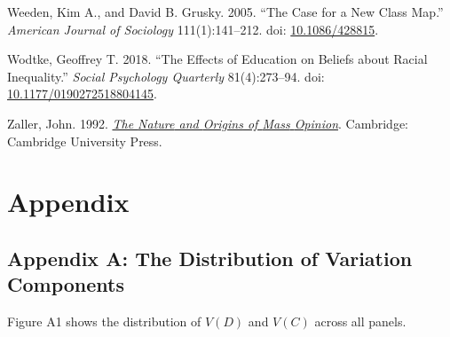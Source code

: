 \documentclass[
  12pt,
]{article}
\newlength{\cslhangindent}
\newlength{\cslentryspacingunit} %
\newenvironment{CSLReferences}[2] %
 {%
  \setlength{\parindent}{0pt}
  \ifodd #1
  \let\oldpar\par
  \def\par{\hangindent=\cslhangindent\oldpar}
  \fi
  \setlength{\parskip}{#2\cslentryspacingunit}
 }%
 {}
\begin{document}
\begin{CSLReferences}{1}{0}
\leavevmode{}%
Weeden, Kim A., and David B. Grusky. 2005. {``The {Case} for a {New}
{Class} {Map}.''} \emph{American Journal of Sociology} 111(1):141--212.
doi: \href{https://doi.org/10.1086/428815}{10.1086/428815}.

\leavevmode{}%
Wodtke, Geoffrey T. 2018. {``The {Effects} of {Education} on {Beliefs}
about {Racial} {Inequality}.''} \emph{Social Psychology Quarterly}
81(4):273--94. doi:
\href{https://doi.org/10.1177/0190272518804145}{10.1177/0190272518804145}.

\leavevmode{}%
Zaller, John. 1992.
\emph{\href{https://doi.org/10.1017/CBO9780511818691}{The {Nature} and
{Origins} of {Mass} {Opinion}}}. Cambridge: Cambridge University Press.

\end{CSLReferences}

\hypertarget{appendix}{%
\section{Appendix}\label{appendix}}

\hypertarget{appendix-a-the-distribution-of-variation-components}{%
\subsection{Appendix A: The Distribution of Variation
Components}\label{appendix-a-the-distribution-of-variation-components}}

Figure A1 shows the distribution of \(V(D)\) and \(V(C)\) across all
panels.
\end{document}
